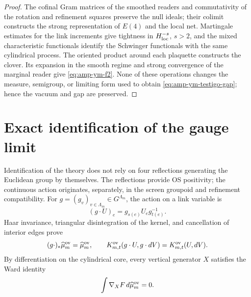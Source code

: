 \begin{proof}
The cofinal Gram matrices of the smoothed readers and commutativity of the
rotation and refinement squares preserve the null ideals; their
colimit constructs the strong representation of \(E(4)\) and the local net.
Martingale estimates for the link increments give tightness in
\(H^{-s}_{\rm loc}\), \(s>2\), and the mixed characteristic functionals identify the
Schwinger functionals with the same cylindrical process. The oriented
product around each plaquette constructs the clover. Its expansion in
the smooth regime and strong convergence of the marginal reader give
\eqref{eq:amp-ym-f2}. None of these operations changes the measure,
semigroup, or limiting form used to obtain
\eqref{eq:amp-ym-testigo-gap}; hence the vacuum and gap are preserved.
\end{proof}

\section*{Exact identification of the gauge limit}

Identification of the theory does not rely on four reflections
generating the Euclidean group by themselves. The reflections provide
OS positivity; the continuous action originates, separately, in the screen
groupoid and refinement compatibility. For
\(g=(g_v)_{v\in\Lambda_m}\in G^{\Lambda_m}\), the action on a link
variable is
\begin{equation}\label{eq:amp-ym-accion-gauge-enlace}
 (g\cdot U)_e=g_{s(e)}U_e g_{t(e)}^{-1}.
\end{equation}
Haar invariance, triangular disintegration of the kernel, and
cancellation of interior edges prove
\begin{equation}\label{eq:amp-ym-invariancia-gauge-medida}
 (g\cdot)_*\widehat\mu_m^{\rm ov}=\widehat\mu_m^{\rm ov},
 \qquad
 K_{m,t}^{\rm ov}(g\cdot U,g\cdot dV)
 =K_{m,t}^{\rm ov}(U,dV).
\end{equation}
By differentiation on the cylindrical core, every vertical generator
\(X\) satisfies the Ward identity
\begin{equation}\label{eq:amp-ym-ward}
 \int \nabla_XF\,d\widehat\mu_m^{\rm ov}=0.
\end{equation}

